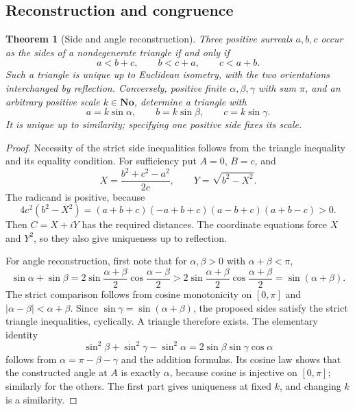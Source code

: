 \documentclass[11pt,letterpaper]{article}
\newtheorem{theorem}{Theorem}[section]
\theoremstyle{definition}
\theoremstyle{remark}
\newcommand{\No}{\mathbf{No}}
\numberwithin{equation}{section}
\begin{document}
\subsection{Reconstruction and congruence}
\begin{theorem}[Side and angle reconstruction]\label{thm:reconstruction}
Three positive surreals $a,b,c$ occur as the sides of a nondegenerate triangle if and only if
\[
 a<b+c,\qquad b<c+a,\qquad c<a+b.
\]
Such a triangle is unique up to Euclidean isometry, with the two orientations interchanged by reflection. Conversely, positive finite $\alpha,\beta,\gamma$ with sum $\pi$, and an arbitrary positive scale $k\in\No$, determine a triangle with
\[
 a=k\sin\alpha,\qquad b=k\sin\beta,\qquad c=k\sin\gamma.
\]
It is unique up to similarity; specifying one positive side fixes its scale.
\end{theorem}
\begin{proof}
Necessity of the strict side inequalities follows from the triangle inequality and its equality condition. For sufficiency put $A=0$, $B=c$, and
\[
 X=\frac{b^2+c^2-a^2}{2c},\qquad Y=\sqrt{b^2-X^2}.
\]
The radicand is positive, because
\begin{equation}\label{eq:heronfactor}
 4c^2(b^2-X^2)
 =(a+b+c)(-a+b+c)(a-b+c)(a+b-c)>0.
\end{equation}
Then $C=X+iY$ has the required distances. The coordinate equations force $X$ and $Y^2$, so they also give uniqueness up to reflection.

For angle reconstruction, first note that for $\alpha,\beta>0$ with $\alpha+\beta<\pi$,
\[
 \sin\alpha+\sin\beta
 =2\sin\frac{\alpha+\beta}{2}\cos\frac{\alpha-\beta}{2}
 >2\sin\frac{\alpha+\beta}{2}\cos\frac{\alpha+\beta}{2}
 =\sin(\alpha+\beta).
\]
The strict comparison follows from cosine monotonicity on $[0,\pi]$ and $|\alpha-\beta|<\alpha+\beta$. Since $\sin\gamma=\sin(\alpha+\beta)$, the proposed sides satisfy the strict triangle inequalities, cyclically. A triangle therefore exists. The elementary identity
\[
 \sin^2\beta+\sin^2\gamma-\sin^2\alpha
 =2\sin\beta\sin\gamma\cos\alpha
\]
follows from $\alpha=\pi-\beta-\gamma$ and the addition formulas. Its cosine law shows that the constructed angle at $A$ is exactly $\alpha$, because cosine is injective on $[0,\pi]$; similarly for the others. The first part gives uniqueness at fixed $k$, and changing $k$ is a similarity.
\end{proof}
\end{document}
